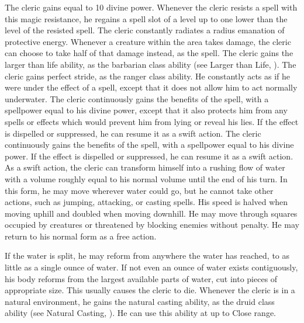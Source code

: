            The cleric gains  equal to 10 \add divine power.
            Whenever the cleric resists a spell with this magic resistance, he regains a spell slot of a level up to one lower than the level of the resisted spell.
            The cleric constantly radiates a \areamed radius emanation of protective energy.
            Whenever a creature within the area takes damage, the cleric can choose to take half of that damage instead, as the  spell.
            The cleric gains the larger than life ability, as the barbarian class ability (see Larger than Life, ).
            The cleric gains perfect stride, as the ranger class ability.
            He constantly acts as if he were under the effect of a  spell, except that it does not allow him to act normally underwater.
             The cleric continuously gains the benefits of the 
            spell, with a spellpower equal to his divine power, except that it also protects him from any spells or effects which would prevent him from lying or reveal his lies.
            If the effect is dispelled or suppressed, he can resume it as a swift action.
             The cleric continuously gains the benefits of the 
            spell, with a spellpower equal to his divine power.
            If the effect is dispelled or suppressed, he can resume it as a swift action.
            As a swift action, the cleric can transform himself into a rushing flow of water with a volume roughly equal to his normal volume until the end of his turn.
            In this form, he may move wherever water could go, but he cannot take other actions, such as jumping, attacking, or casting spells.
            His speed is halved when moving uphill and doubled when moving downhill.
            He may move through squares occupied by creatures or threatened by blocking enemies without penalty.
            He may return to his normal form as a free action.
            \par If the water is split, he may reform from anywhere the water has reached, to as little as a single ounce of water.
            If not even an ounce of water exists contiguously, his body reforms from the largest available parts of water, cut into pieces of appropriate size.
            This usually causes the cleric to die.
            Whenever the cleric is in a natural environment, he gains the natural casting ability, as the druid class ability (see Natural Casting, ).
            He can use this ability at up to Close range.

